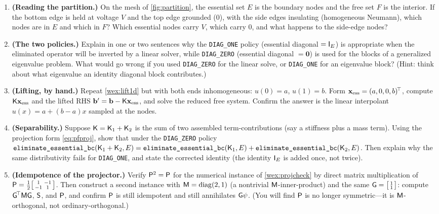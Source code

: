 \exercisessection
\begin{enumerate}[nosep]
  \item \textbf{(Reading the partition.)} On the mesh of \cref{fig:partition}, the
  essential set $E$ is the boundary nodes and the free set $F$ is the interior.
  If the bottom edge is held at voltage $V$ and the top edge grounded ($0$), with
  the side edges insulating (homogeneous Neumann), which nodes are in $E$ and which
  in $F$? Which essential nodes carry $V$, which carry $0$, and what happens to the
  side-edge nodes?

  \item \textbf{(The two policies.)} Explain in one or two sentences why the
  \texttt{DIAG\_ONE} policy (essential diagonal $=\mathsf{I}_E$) is appropriate when
  the eliminated operator will be inverted by a linear solver, while
  \texttt{DIAG\_ZERO} (essential diagonal $=\mathbf{0}$) is used for the blocks of
  a generalized eigenvalue problem. What would go wrong if you used
  \texttt{DIAG\_ZERO} for the linear solve, or \texttt{DIAG\_ONE} for an eigenvalue
  block? (Hint: think about what eigenvalue an identity diagonal block contributes.)

  \item \textbf{(Lifting, by hand.)} Repeat \cref{wex:lift1d} but with both ends
  inhomogeneous: $u(0)=a$, $u(1)=b$. Form $\mathbf{x}_{\mathrm{ess}}=(a,0,0,b)^{\!\top}$,
  compute $\mathsf{K}\mathbf{x}_{\mathrm{ess}}$ and the lifted RHS
  $\mathbf{b}'=\mathbf{b}-\mathsf{K}\mathbf{x}_{\mathrm{ess}}$, and solve the reduced free system. Confirm
  the answer is the linear interpolant $u(x)=a+(b-a)x$ sampled at the nodes.

  \item \textbf{(Separability.)} Suppose $\mathsf{K}=\mathsf{K}_1+\mathsf{K}_2$ is the sum
  of two assembled term-contributions (say a stiffness plus a mass term). Using the
  projection form \cref{eq:pfproj}, show that under the \texttt{DIAG\_ZERO} policy
  $\texttt{eliminate\_essential\_bc}(\mathsf{K}_1+\mathsf{K}_2,E)
  =\texttt{eliminate\_essential\_bc}(\mathsf{K}_1,E)+\texttt{eliminate\_essential\_bc}(\mathsf{K}_2,E)$.
  Then explain why the same distributivity fails for \texttt{DIAG\_ONE}, and state
  the corrected identity (the identity $\mathsf{I}_E$ is added once, not twice).

  \item \textbf{(Idempotence of the projector.)} Verify $\mathsf{P}^2=\mathsf{P}$ for the
  numerical instance of \cref{wex:projcheck} by direct matrix multiplication of
  $\mathsf{P}=\tfrac12\bigl[\begin{smallmatrix}1&-1\\-1&1\end{smallmatrix}\bigr]$. Then
  construct a second instance with $\mathsf{M}=\mathrm{diag}(2,1)$ (a nontrivial
  $\mathsf{M}$-inner-product) and the same
  $\mathsf{G}=\bigl[\begin{smallmatrix}1\\1\end{smallmatrix}\bigr]$: compute
  $\mathsf{G}^{\!\top}\mathsf{M}\mathsf{G}$, $\mathsf{S}$, and $\mathsf{P}$, and confirm $\mathsf{P}$
  is still idempotent and still annihilates $\mathsf{G}\psi$. (You will find $\mathsf{P}$
  is no longer symmetric---it is $\mathsf{M}$-orthogonal, not ordinary-orthogonal.)


\end{enumerate}
